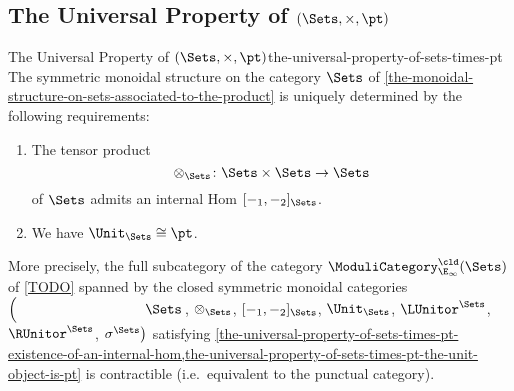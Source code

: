 \subsection{The Universal Property of $(\Sets,\times,\pt)$}\label{subsection-the-universal-property-of-sets-times-pt}
\begin{theorem}{The Universal Property of $(\Sets,\times,\pt)$}{the-universal-property-of-sets-times-pt}%
    The symmetric monoidal structure on the category $\Sets$ of \cref{the-monoidal-structure-on-sets-associated-to-the-product} is uniquely determined by the following requirements:
    \begin{enumerate}
        \item\label{the-universal-property-of-sets-times-pt-existence-of-an-internal-hom}The tensor product
            \[
                \otimes_{\Sets}%
                \colon
                \Sets\times\Sets
                \to
                \Sets
            \]%
            of $\Sets$ admits an internal Hom $[-_{1},-_{2}]_{\Sets}$.
        \item\label{the-universal-property-of-sets-times-pt-the-unit-object-is-pt}We have $\Unit_{\Sets}\cong\pt$.
    \end{enumerate}
    More precisely, the full subcategory of the category $\ModuliCategory^{\cld}_{\E_{\infty}}(\Sets)$ of \cref{TODO} spanned by the closed symmetric monoidal categories $\left(\phantom{\mrp{\LUnitor^{\Sets}}}\Sets\right.$, $\otimes_{\Sets}$, $[-_{1},-_{2}]_{\Sets}$, $\Unit_{\Sets}$, $\LUnitor^{\Sets}$, $\RUnitor^{\Sets}$, $\left.\sigma^{\Sets}\right)$ satisfying \cref{the-universal-property-of-sets-times-pt-existence-of-an-internal-hom,the-universal-property-of-sets-times-pt-the-unit-object-is-pt} is contractible (i.e.\ equivalent to the punctual category).
\end{theorem}
